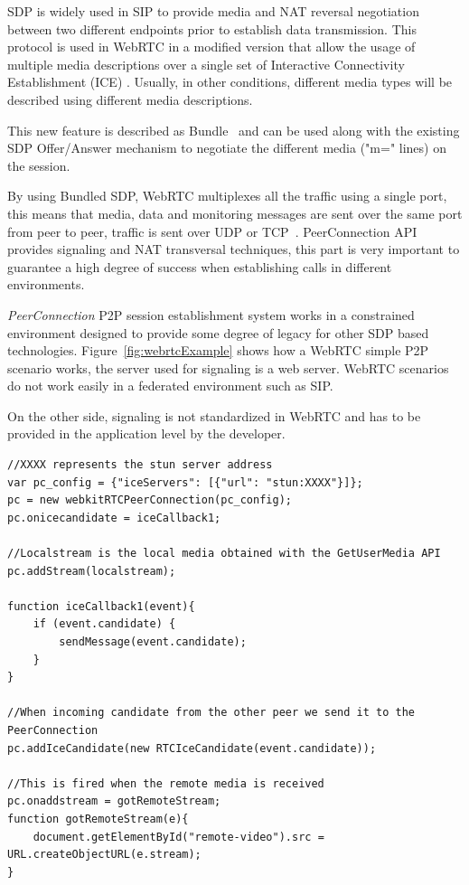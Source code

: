 SDP is widely used in SIP to provide media and NAT reversal negotiation between two different endpoints prior to establish data transmission. This protocol is used in WebRTC in a modified version that allow the usage of multiple media descriptions over a single set of Interactive Connectivity Establishment (ICE) . Usually, in other conditions, different media types will be described using different media descriptions.

This new feature is described as Bundle~\cite{SDPBUNDLE} and can be used along with the existing SDP Offer/Answer mechanism to negotiate the different media ("m=" lines) on the session.

By using Bundled SDP, WebRTC multiplexes all the traffic using a single port, this means that media, data and monitoring messages are sent over the same port from peer to peer, traffic is sent over UDP or TCP~\cite{alvestrandOverview2012}. PeerConnection API provides signaling and NAT transversal techniques, this part is very important to guarantee a high degree of success when establishing calls in different environments.

{\it PeerConnection} P2P session establishment system works in a constrained environment designed to provide some degree of legacy for other SDP based technologies. Figure~\ref{fig:webrtcExample} shows how a WebRTC simple P2P scenario works, the server used for signaling is a web server. WebRTC scenarios do not work easily in a federated environment such as SIP.

On the other side, signaling is not standardized in WebRTC and has to be provided in the application level by the developer.

\lstset{language=JavaScript}
\begin{lstlisting}[caption=Simple example of {\it PeerConnection} using JavaScript,label={lst:listing2}]
//XXXX represents the stun server address
var pc_config = {"iceServers": [{"url": "stun:XXXX"}]};
pc = new webkitRTCPeerConnection(pc_config);
pc.onicecandidate = iceCallback1;

//Localstream is the local media obtained with the GetUserMedia API
pc.addStream(localstream);

function iceCallback1(event){
	if (event.candidate) {
		sendMessage(event.candidate);
	}
}

//When incoming candidate from the other peer we send it to the PeerConnection
pc.addIceCandidate(new RTCIceCandidate(event.candidate));

//This is fired when the remote media is received
pc.onaddstream = gotRemoteStream; 
function gotRemoteStream(e){
	document.getElementById("remote-video").src = URL.createObjectURL(e.stream);
}
\end{lstlisting}

